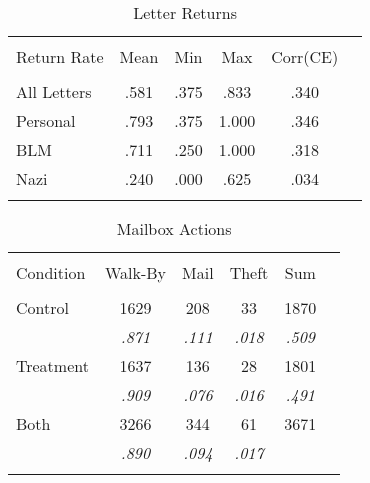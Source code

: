 \documentclass{article}\usepackage[]{graphicx}\usepackage[]{color}
\begin{document}
\begin{table}[!htbp]
\centering
\caption{Letter Returns}
\begin{tabular}{lccccc} 
\\[-1.8ex]\hline 
\hline \\[-1.8ex] 
Return Rate       & Mean    & Min    & Max    & Corr(CE) \\
\hline \\[-1.8ex] 
All Letters       & .581   & .375  & .833  & .340  \\
Personal	        & .793   & .375  & 1.000  & .346  \\
BLM	              & .711   &	.250  & 1.000  & .318  \\
Nazi              &	.240   &	.000  & .625  & .034  \\
\hline \\[-1.8ex]
\end{tabular}
\end{table}

\begin{table}[!htbp]
\centering
\caption{Mailbox Actions}
\begin{tabular}{lccccc} 
\\[-1.8ex]\hline 
\hline \\[-1.8ex]
Condition & Walk-By  & Mail    & Theft   & Sum     \\
\hline \\[-1.8ex] 
    Control     &  1629   & 208     &  33     & 1870\\
          &\textit{.871} &\textit{.111} &\textit{.018} &\textit{.509} \\
    Treatment     &  1637   & 136     &  28     & 1801\\
          &\textit{.909} &\textit{.076} &\textit{.016} &\textit{.491} \\
Both       & 3266    & 344     & 61      & 3671  \\
          &\textit{.890} &\textit{.094} &\textit{.017} &         \\
          \hline \\[-1.8ex]
\end{tabular}
\end{table}
\end{document}
